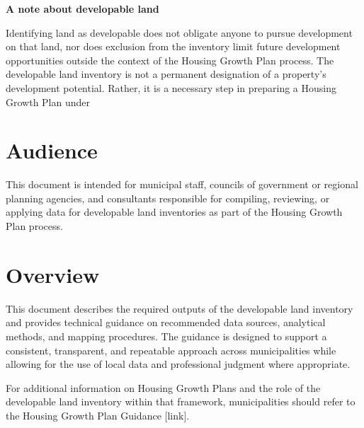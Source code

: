 \documentclass[
  letterpaper,
  DIV=11,
  numbers=noendperiod]{scrreprt}
\begin{document}
\begin{tcolorbox}[enhanced jigsaw, arc=.35mm, bottomrule=.15mm, breakable, colback=white, colframe=quarto-callout-note-color-frame, left=2mm, leftrule=.75mm, opacityback=0, rightrule=.15mm, toprule=.15mm]
\begin{minipage}[t]{5.5mm}
\textcolor{quarto-callout-note-color}{\faInfo}
\end{minipage}%
\begin{minipage}[t]{\textwidth - 5.5mm}

\vspace{-3mm}\textbf{A note about developable land}\vspace{3mm}

Identifying land as developable does not obligate anyone to pursue
development on that land, nor does exclusion from the inventory limit
future development opportunities outside the context of the Housing
Growth Plan process. The developable land inventory is not a permanent
designation of a property's development potential. Rather, it is a
necessary step in preparing a Housing Growth Plan under

\end{minipage}%
\end{tcolorbox}

\section{Audience}\label{audience}

This document is intended for municipal staff, councils of government or
regional planning agencies, and consultants responsible for compiling,
reviewing, or applying data for developable land inventories as part of
the Housing Growth Plan process.

\section{Overview}\label{overview}

This document describes the required outputs of the developable land
inventory and provides technical guidance on recommended data sources,
analytical methods, and mapping procedures. The guidance is designed to
support a consistent, transparent, and repeatable approach across
municipalities while allowing for the use of local data and professional
judgment where appropriate.

For additional information on Housing Growth Plans and the role of the
developable land inventory within that framework, municipalities should
refer to the Housing Growth Plan Guidance {[}link{]}.
\end{document}

